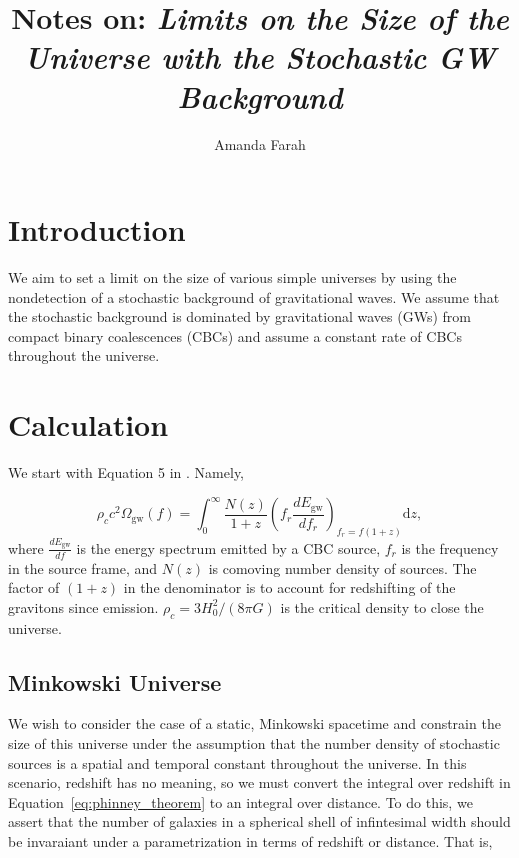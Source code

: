 \documentclass[]{article}
\title{Notes on: \emph{Limits on the Size of the Universe with the Stochastic GW Background}}
\author{Amanda Farah}
\newcommand{\Ogw}{\Omega_{\mathrm{gw}}}
\begin{document}
\maketitle

%

\section{Introduction}
We aim to set a limit on the size of various simple universes by using the nondetection of a stochastic background of gravitational waves. 
We assume that the stochastic background is dominated by gravitational waves (GWs) from compact binary coalescences (CBCs) and assume a constant rate of CBCs throughout the universe.

\section{Calculation}

We start with Equation 5 in \cite{Phinney_theorem}. Namely,

\begin{equation}
	\rho_c c^2 \Ogw(f) =  \int_{0}^{\infty} \frac{N(z)}{1+z} (f_r \frac{dE_{\mathrm{gw}}}{df_r})_{f_r = f(1+z)} \mathrm{d}z ,
	\label{eq:phinney_theorem}
\end{equation}
where $\frac{dE_{\mathrm{gw}}}{df}$ is the energy spectrum emitted by a CBC source, $f_r$ is the frequency in the source frame, and $N(z)$ is comoving number density of sources.
The factor of $(1+z)$ in the denominator is to account for redshifting of the gravitons since emission. 
$\rho_c = 3 H_0^2/(8\pi G)$ is the critical density to close the universe.
	
\subsection{Minkowski Universe}	
We wish to consider the case of a static, Minkowski spacetime and constrain the size of this universe under the assumption that the number density of stochastic sources is a spatial and temporal constant throughout the universe.
In this scenario, redshift has no meaning, so we must convert the integral over redshift in Equation~\ref{eq:phinney_theorem} to an integral over distance.
To do this, we assert that the number of galaxies in a spherical shell of infintesimal width should be invaraiant under a parametrization in terms of redshift or distance. 
That is,
\end{document}
